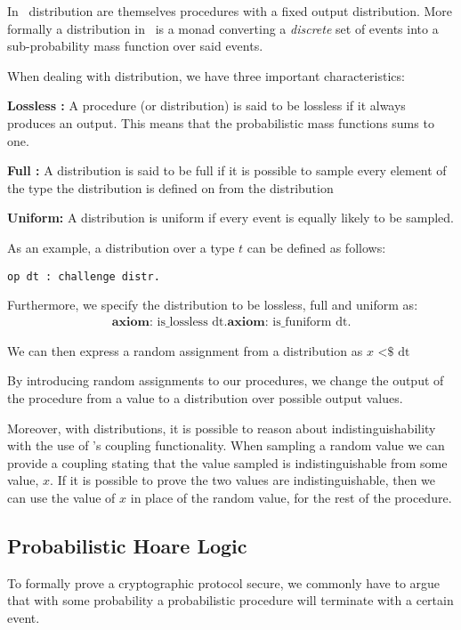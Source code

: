 In \easycrypt\ distribution are themselves procedures with a fixed output
distribution. More formally a distribution in \easycrypt\ is a monad converting a
\textit{discrete} set of events into a sub-probability mass function over said events.

When dealing with distribution, we have three important characteristics:

\noindent \textbf{Lossless :} A procedure (or distribution) is said to be
lossless if it always produces an output. This means that the
probabilistic mass functions sums to one.

\noindent \textbf{Full :} A distribution is said to be full if it is
possible to sample every element of the type the distribution is defined on from
the distribution

\noindent \textbf{Uniform: } A distribution is uniform if every event is equally
likely to be sampled.

As an example, a distribution over a type $t$ can be defined as follows:
\begin{lstlisting}[frame=none]
op dt : challenge distr.
\end{lstlisting}
Furthermore, we specify the distribution to be lossless, full and uniform as:
\begin{gather*}
  \textbf{axiom: } \text{is\_lossless dt}.
  \textbf{axiom: } \text{is\_funiform dt}.
\end{gather*}

We can then express a random assignment from a distribution as $x \text{ <\$} \text{ dt}$


By introducing random assignments to our procedures, we change
the output of the procedure from a value to a distribution over possible output values.

Moreover, with distributions, it is possible to reason about indistinguishability
with the use of \easycrypt's coupling functionality. When sampling a random
value we can provide a coupling stating that the value sampled is
indistinguishable from some value, $x$. If it is possible to prove the two
values are indistinguishable, then we can use the value of $x$ in place of the
random value, for the rest of the procedure.


\subsection{Probabilistic Hoare Logic}
\label{sec:pHL}
To formally prove a cryptographic protocol secure, we commonly have to argue
that with some probability a probabilistic procedure will terminate with a certain event.

